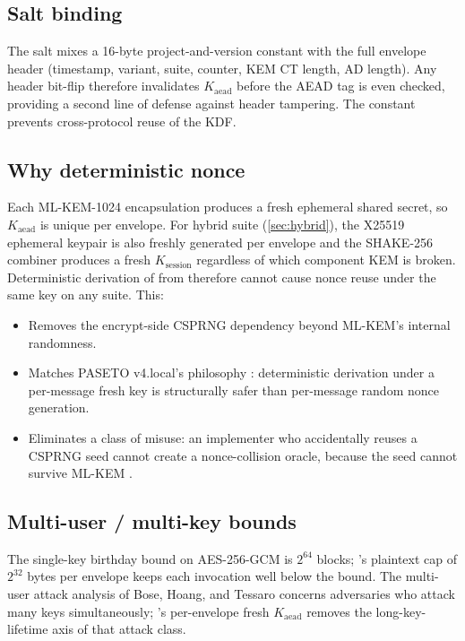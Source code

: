 \subsection{Salt binding}

The salt mixes a 16-byte project-and-version constant with the full envelope header (timestamp, variant, suite, counter, KEM CT length, AD length). Any header bit-flip therefore invalidates $K_{\mathrm{aead}}$ before the AEAD tag is even checked, providing a second line of defense against header tampering. The constant prevents cross-protocol reuse of the KDF.

\subsection{Why deterministic nonce}

Each ML-KEM-1024 encapsulation produces a fresh ephemeral shared secret, so $K_{\mathrm{aead}}$ is unique per envelope. For hybrid suite  (\cref{sec:hybrid}), the X25519 ephemeral keypair is also freshly generated per envelope and the SHAKE-256 combiner produces a fresh $K_{\mathrm{session}}$ regardless of which component KEM is broken. Deterministic derivation of  from  therefore cannot cause nonce reuse under the same key on any suite. This:
\begin{itemize}
\item Removes the encrypt-side CSPRNG dependency beyond ML-KEM's internal  randomness.
\item Matches PASETO v4.local's philosophy \citep{paseto-v4}: deterministic derivation under a per-message fresh key is structurally safer than per-message random nonce generation.
\item Eliminates a class of misuse: an implementer who accidentally reuses a CSPRNG seed cannot create a nonce-collision oracle, because the seed cannot survive ML-KEM  \citep{fips203}.
\end{itemize}

\subsection{Multi-user / multi-key bounds}

The single-key birthday bound on AES-256-GCM is $2^{64}$ blocks; \pqcrypt{}'s plaintext cap of $2^{32}$ bytes per envelope keeps each invocation well below the bound. The multi-user attack analysis of Bose, Hoang, and Tessaro \citep{bose2018muser} concerns adversaries who attack many keys simultaneously; \pqcrypt{}'s per-envelope fresh $K_{\mathrm{aead}}$ removes the long-key-lifetime axis of that attack class.
